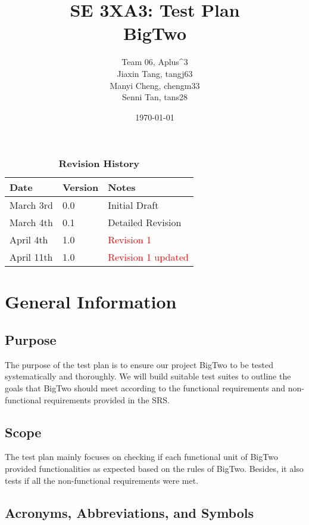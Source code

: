 \documentclass[12pt, titlepage]{article}
\title{SE 3XA3: Test Plan\\BigTwo}
\author{Team 06, Aplus^3
		\\ Jiaxin Tang, tangj63
		\\ Manyi Cheng, chengm33
		\\ Senni Tan, tans28
}
\date{\today}
\begin{document}
\maketitle

\tableofcontents
\listoftables
\listoffigures

\begin{table}[bp]
\caption{\bf Revision History}
\begin{tabularx}{\textwidth}{p{3cm}p{2cm}X}
\toprule {\bf Date} & {\bf Version} & {\bf Notes}\\
\midrule
March 3rd & 0.0 & Initial Draft\\
March 4th & 0.1 & Detailed Revision\\
April 4th & 1.0 & \textcolor{red}{Revision 1}\\
April 11th & 1.0 & \textcolor{red}{Revision 1 updated}\\

\bottomrule
\end{tabularx}
\end{table}

\newpage


\section{General Information}

\subsection{Purpose}
The purpose of the test plan is to ensure our project BigTwo to be tested systematically and thoroughly. We will build suitable test suites to outline the goals that BigTwo should meet according to the functional requirements and non-functional requirements provided in the SRS.

\subsection{Scope}
The test plan mainly focuses on checking if each functional unit of BigTwo provided functionalities as expected based on the rules of BigTwo. Besides, it also tests if all the non-functional requirements were met.

\subsection{Acronyms, Abbreviations, and Symbols}
	
\end{document}
